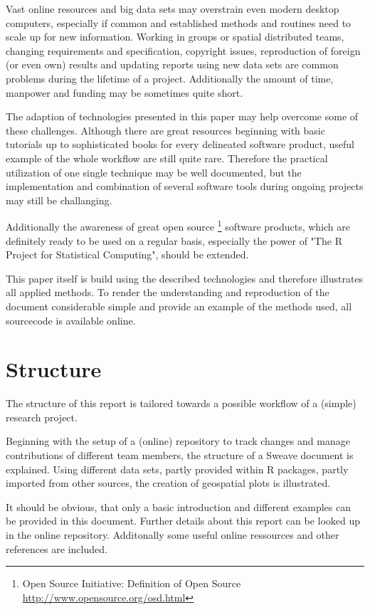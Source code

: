 \documentclass{ifacconf}
\begin{document}
Vast online resources and big data sets may overstrain
even modern desktop computers, especially if common and established methods
and routines need to scale up for new information. 
Working in groups or spatial distributed teams,  
changing requirements and specification, copyright issues, reproduction of 
foreign (or even own) results  and updating reports using new data sets are common 
problems during the lifetime of a project. 
Additionally the amount of time, manpower and funding 
may be sometimes quite short.

The adaption of technologies presented in this paper may help overcome
some of these challenges. Although there are great resources beginning with 
basic tutorials up to sophisticated books for every delineated software product,
useful example of the whole workflow are still quite rare. Therefore the 
practical utilization of one single technique may be well documented, but
the implementation and combination of several software tools during ongoing
projects may still be challanging.

Additionally the awareness of great open source
\footnote{Open Source Initiative: Definition of Open Source \url{http://www.opensource.org/osd.html}} 
software products, which are 
definitely ready to be used on a regular basis, especially the power of "The R Project
for Statistical Computing", should be extended.

This paper itself is build using the described technologies and therefore illustrates 
all applied methods. To render the understanding and reproduction of the document 
considerable simple and provide an example of the methods used, all sourcecode is
available online.

\section{Structure}
The structure of this report is tailored towards a possible workflow of a (simple)
research project. 

Beginning with the setup of a (online) repository to track changes and manage 
contributions of different team members, the structure of a Sweave document is
explained. Using different data sets, partly provided within R packages, partly
imported from other sources, the creation of geospatial plots is illustrated. 

It should be obvious, that only a basic introduction and different examples 
can be provided in this document. Further details about this report can be
looked up in the online repository. Additonally some useful online ressources
and other references are included.
\end{document}
